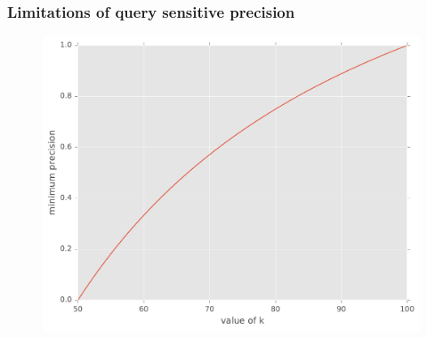 \begin{frame}
  \frametitle{Limitations of query sensitive precision}
  \begin{figure}[tbph]
    \centering
    \includegraphics[width=0.95\linewidth]{images/limits_of_percentage_precision_new}
  \end{figure}
\end{frame}